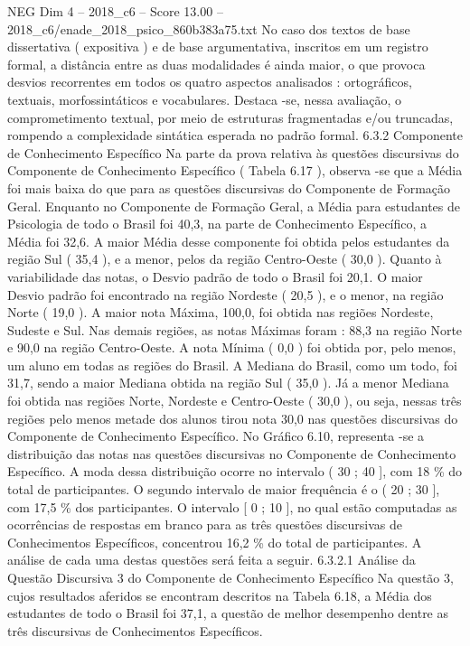 \begin{textsample}{NEG Dim 4 – 2018\_c6 – Score 13.00 – 2018\_c6/enade\_2018\_psico\_860b383a75.txt}
No caso dos textos de base dissertativa ( expositiva ) e de base argumentativa, inscritos em um registro formal, a distância entre as duas modalidades é ainda maior, o que provoca desvios recorrentes em todos os quatro aspectos analisados : ortográficos, textuais, morfossintáticos e vocabulares.
Destaca -se, nessa avaliação, o comprometimento textual, por meio de estruturas fragmentadas e/ou truncadas, rompendo a complexidade sintática esperada no padrão formal. 6.3.2 Componente de Conhecimento Específico Na parte da prova relativa às questões discursivas do Componente de Conhecimento Específico ( Tabela 6.17 ), observa -se que a Média foi mais baixa do que para as questões discursivas do Componente de Formação Geral.
Enquanto no Componente de Formação Geral, a Média para estudantes de Psicologia de todo o Brasil foi 40,3, na parte de Conhecimento Específico, a Média foi 32,6.
A maior Média desse componente foi obtida pelos estudantes da região Sul ( 35,4 ), e a menor, pelos da região Centro-Oeste ( 30,0 ).
Quanto à variabilidade das notas, o Desvio padrão de todo o Brasil foi 20,1.
O maior Desvio padrão foi encontrado na região Nordeste ( 20,5 ), e o menor, na região Norte ( 19,0 ).
A maior nota Máxima, 100,0, foi obtida nas regiões Nordeste, Sudeste e Sul.
Nas demais regiões, as notas Máximas foram : 88,3 na região Norte e 90,0 na região Centro-Oeste.
A nota Mínima ( 0,0 ) foi obtida por, pelo menos, um aluno em todas as regiões do Brasil.
A Mediana do Brasil, como um todo, foi 31,7, sendo a maior Mediana obtida na região Sul ( 35,0 ).
Já a menor Mediana foi obtida nas regiões Norte, Nordeste e Centro-Oeste ( 30,0 ), ou seja, nessas três regiões pelo menos metade dos alunos tirou nota 30,0 nas questões discursivas do Componente de Conhecimento Específico.
No Gráfico 6.10, representa -se a distribuição das notas nas questões discursivas no Componente de Conhecimento Específico.
A moda dessa distribuição ocorre no intervalo ( 30 ; 40 ], com 18 \% do total de participantes.
O segundo intervalo de maior frequência é o ( 20 ; 30 ], com 17,5 \% dos participantes.
O intervalo [ 0 ; 10 ], no qual estão computadas as ocorrências de respostas em branco para as três questões discursivas de Conhecimentos Específicos, concentrou 16,2 \% do total de participantes.
A análise de cada uma destas questões será feita a seguir. 6.3.2.1 Análise da Questão Discursiva 3 do Componente de Conhecimento Específico Na questão 3, cujos resultados aferidos se encontram descritos na Tabela 6.18, a Média dos estudantes de todo o Brasil foi 37,1, a questão de melhor desempenho dentre as três discursivas de Conhecimentos Específicos.

\end{textsample}
